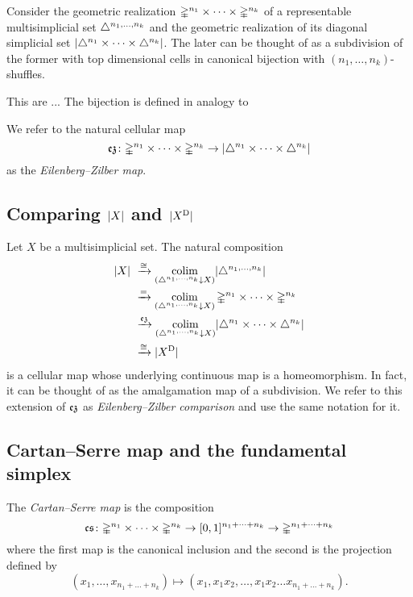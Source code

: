 Consider the geometric realization $\mathbb{\Delta}^{n_1} \times \dots \times \mathbb{\Delta}^{n_k}$ of a representable multisimplicial set $\triangle^{n_1, \dots, n_k}$ and the geometric realization of its diagonal simplicial set $\lvert\triangle^{n_1} \times \dots \times \triangle^{n_k}\rvert$.
The later can be thought of as a subdivision of the former with top dimensional cells in canonical bijection with $(n_1, \dots, n_k)$-shuffles.

This are ... 
The bijection is defined in analogy to 

We refer to the natural cellular map
\[
\operatorname{\mathfrak{ez}} \colon
\mathbb{\Delta}^{n_1} \times \dots \times \mathbb{\Delta}^{n_k} \to
\lvert\triangle^{n_1} \times \dots \times \triangle^{n_k}\rvert
\]
as the \textit{Eilenberg--Zilber map}.

\subsection{Comparing $\lvert X\rvert$ and $\lvert X^{\mathrm{D}}\rvert$}

Let $X$ be a multisimplicial set.
The natural composition
\begin{equation} \label{e:ez comparison}
\begin{split}
\lvert X\rvert \ &\xrightarrow{\cong}
\operatorname*{colim}_{(\triangle^{n_1, \dots, n_k} \downarrow X)} \lvert\triangle^{n_1, \dots, n_k}\rvert \\ &\xrightarrow{=}
\operatorname*{colim}_{(\triangle^{n_1, \dots, n_k} \downarrow X)} \mathbb{\Delta}^{n_1} \times \dots \times \mathbb{\Delta}^{n_k} \\ &\xrightarrow{\operatorname{\mathfrak{ez}}}
\operatorname*{colim}_{(\triangle^{n_1, \dots, n_k} \downarrow X)} \lvert\triangle^{n_1} \times \dots \times \triangle^{n_k}\rvert \\ &\xrightarrow{\cong}
\lvert X^{\mathrm{D}}\rvert
\end{split}
\end{equation}
is a cellular map whose underlying continuous map is a homeomorphism.
In fact, it can be thought of as the amalgamation
map of a subdivision.
We refer to this extension of $\operatorname{\mathfrak{ez}}$ as \textit{Eilenberg--Zilber comparison} and use the same notation for it.


\subsection{Cartan--Serre map and the fundamental simplex}

The \textit{Cartan--Serre map} is the composition
\[
\operatorname{\mathfrak{cs}} \colon
\mathbb{\Delta}^{n_1} \times \dots \times \mathbb{\Delta}^{n_k} \to
[0,1]^{n_1 + \dots + n_k} \to
\mathbb{\Delta}^{n_1 + \dots + n_k}
\]
where the first map is the canonical inclusion and the second is the projection defined by
\[
(x_1, \dots, x_{n_1 + \dots + n_k}) \mapsto (x_1, x_1x_2, \dots, x_1x_2 \dots x_{n_1 + \dots + n_k}).
\]

